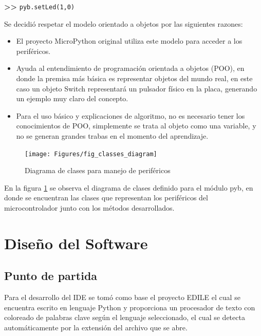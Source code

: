 \textbf{{\fontsize{16}{16}\selectfont \textgreater\textgreater}} \texttt{pyb.setLed(1,0)}

Se decidió respetar el modelo orientado a objetos por las siguientes razones:

\begin{itemize}
	\item El proyecto MicroPython original utiliza este modelo para acceder a los periféricos.
	\item Ayuda al entendimiento de programación orientada a objetos (POO), en donde la premisa más básica es representar objetos del mundo real, en este caso un objeto Switch representará un pulsador físico en la placa, generando un ejemplo muy claro del concepto.
	\item Para el uso básico y explicaciones de algoritmo, no es necesario tener los conocimientos de POO, simplemente se trata al objeto como una variable, y no se generan grandes trabas en el momento del aprendizaje.
\end{itemize}

\begin{figure}[ht]
  \centering
    \texttt{[image: Figures/fig\_classes\_diagram]}
  \caption{Diagrama de clases para manejo de periféricos}
  \label{fig:classes}
\end{figure}

En la figura \ref{fig:classes} se observa el diagrama de clases definido para el módulo pyb, en donde se encuentran las clases que representan los periféricos del microcontrolador junto con los métodos desarrollados.


\section{Diseño del Software}

\subsection{Punto de partida} 

Para el desarrollo del IDE se tomó como base el proyecto EDILE \cite{edile} el cual se encuentra escrito en lenguaje Python y proporciona un procesador de texto con coloreado de palabras clave según el lenguaje seleccionado, el cual se detecta automáticamente por la extensión del archivo que se abre.

